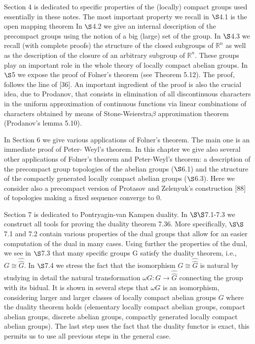 \documentclass[12pt]{article}
\begin{document}
    Section 4 is dedicated to specific properties of the (locally) compact groups used essentially in these notes.
The most important property we recall in $ \S $4.1 is the open mapping theorem In $ \S $4.2 we give an internal
description of the precompact groups using the notion of a big (large) set of the group. In $ \S $4.3 we recall
(with complete proofs) the structure of the closed subgroups of $ \mathbb{R}^n $ as well as the description of the closure of an
arbitrary subgroup of $ \mathbb{R}^n $. These groups play an important role in the whole theory of locally compact abelian
groups. In $ \S $5 we expose the proof of Folner's theorem (see Theorem 5.12). The proof, follows the line of [36].
An important ingredient of the proof is also the crucial idea, due to Prodanov, that consists in elimination of
all discontinuous characters in the uniform approximation of continuous functions via linear combinations of
characters obtained by means of Stone-Weierstra$\beta$ approximation theorem (Prodanov's lemma 5.10).


    In Section 6 we give various applications of Folner's theorem. The main one is an immediate proof of Peter-
Weyl's theorem. In this chapter we give also several other applications of Folner's theorem and Peter-Weyl's
theorem: a description of the precompact group topologies of the abelian groups ($ \S $6.1) and the structure of
the compactly generated locally compact abelian groups ($ \S $6.3). Here we consider also a precompact version of
Protasov and Zelenyuk's construction [88] of topologies making a fixed sequence converge to 0.


    Section 7 is dedicated to Pontryagin-van Kampen duality. In $ \S\S $7.1-7.3 we construct all tools for proving the
duality theorem 7.36. More specifically, $ \S\S $7.1 and 7.2 contain various properties of the dual groups that allow
for an easier computation of the dual in many cases. Using further the properties of the dual, we see in $ \S $7.3 that
many specific groups G satisfy the duality theorem, i.e., $ G \cong \widehat{\widehat{G}} $. In $ \S $7.4 we stress the fact that the isomorphism
$ G \cong \widehat{\widehat{G}} $ is natural by studying in detail the natural transformation $ \omega G : G \to \widehat{\widehat{G}} $ connecting the group with
its bidual. It is shown in several steps that $ \omega G $ is an isomorphism, considering larger and larger classes of
locally compact abelian groups $ G $ where the duality theorem holds (elementary locally compact abelian groups,
compact abelian groups, discrete abelian groups, compactly generated locally compact abelian groups). The
last step uses the fact that the duality functor is exact, this permits us to use all previous steps in the general
case.
\end{document}

